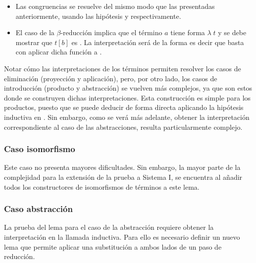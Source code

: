 \begin{itemize}
	\item Las congruencias se resuelve del mismo modo que las presentadas anteriormente, usando las hipótesis  y  respectivamente.
	\item El caso de la $\beta$-reducción implica que el término $a$ tiene forma $\lambda\; t$ y se debe mostrar que $t [b]$ es \snstar.
	La interpretación  será de la forma
	\snstar{}
	\snstar{}
	es decir que basta con aplicar dicha función a .
\end{itemize}


Notar cómo las interpretaciones de los términos permiten resolver los casos de eliminación (proyección y aplicación), pero, por otro lado, los casos de introducción (producto y abstracción) se vuelven más complejos, ya que son estos donde se construyen dichas interpretaciones.
Esta construcción es simple para los productos, puesto que se puede deducir de forma directa aplicando la hipótesis inductiva en .	
Sin embargo, como se verá más adelante, obtener la interpretación correspondiente al caso de las abstracciones, resulta particularmente complejo.

\subsubsection{Caso isomorfismo}

Este caso no presenta mayores dificultades. Sin embargo, la mayor parte de la complejidad para la extensión de la prueba a Sistema I, se encuentra al añadir todos los constructores de isomorfismos de términos a este lema.


\subsubsection{Caso abstracción}

La prueba del lema para el caso de la abstracción requiere obtener la interpretación  en la llamada inductiva.
Para ello es necesario definir un nuevo lema que permite aplicar una substitución a ambos lados de un paso de reducción.

